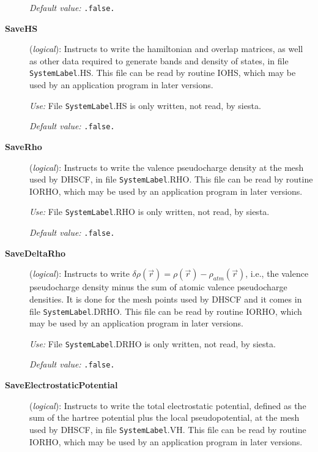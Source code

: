 \documentclass[11pt]{article}
\begin{document}
\begin{description}
{\it Default value:} {\tt .false.}
        

\item[{\bf SaveHS}] ({\it logical}): 
Instructs to write the hamiltonian and overlap matrices, as well
as other data required to generate bands and density of states,
in file {\tt SystemLabel}.HS. This file can be read by routine IOHS,
which may be used by an application program in later versions.

{\it Use:} File {\tt SystemLabel}.HS is only written, not read, by siesta.

{\it Default value:} {\tt .false.}
        

\item[{\bf SaveRho}] ({\it logical}): 
Instructs to write the valence pseudocharge density at the
mesh used by DHSCF,
in file {\tt SystemLabel}.RHO. This file can be read by routine IORHO,
which may be used by an application program in later versions.

{\it Use:} File {\tt SystemLabel}.RHO is only written, not read, by siesta.

{\it Default value:} {\tt .false.}
        

\item[{\bf SaveDeltaRho}] ({\it logical}): 
Instructs to write $\delta \rho(\vec r) = \rho(\vec r) - \rho_{atm}(\vec r)$,
i.e., the valence pseudocharge density minus the sum of atomic valence
pseudocharge densities. It is done for the mesh points used by DHSCF and it
comes in file {\tt SystemLabel}.DRHO. This file can be read by routine IORHO,
which may be used by an application program in later versions.

{\it Use:} File {\tt SystemLabel}.DRHO is only written, not read, by siesta.

{\it Default value:} {\tt .false.}
        

\item[{\bf SaveElectrostaticPotential}] ({\it logical}): 
Instructs to write the total electrostatic potential, defined as the
sum of the hartree potential plus the local pseudopotential, at the
mesh used by DHSCF,
in file {\tt SystemLabel}.VH. This file can be read by routine IORHO,
which may be used by an application program in later versions.


\end{description}
\end{document}
